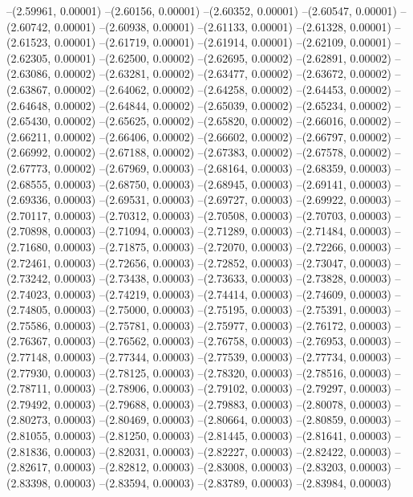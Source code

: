 --(2.59961, 0.00001)
--(2.60156, 0.00001)
--(2.60352, 0.00001)
--(2.60547, 0.00001)
--(2.60742, 0.00001)
--(2.60938, 0.00001)
--(2.61133, 0.00001)
--(2.61328, 0.00001)
--(2.61523, 0.00001)
--(2.61719, 0.00001)
--(2.61914, 0.00001)
--(2.62109, 0.00001)
--(2.62305, 0.00001)
--(2.62500, 0.00002)
--(2.62695, 0.00002)
--(2.62891, 0.00002)
--(2.63086, 0.00002)
--(2.63281, 0.00002)
--(2.63477, 0.00002)
--(2.63672, 0.00002)
--(2.63867, 0.00002)
--(2.64062, 0.00002)
--(2.64258, 0.00002)
--(2.64453, 0.00002)
--(2.64648, 0.00002)
--(2.64844, 0.00002)
--(2.65039, 0.00002)
--(2.65234, 0.00002)
--(2.65430, 0.00002)
--(2.65625, 0.00002)
--(2.65820, 0.00002)
--(2.66016, 0.00002)
--(2.66211, 0.00002)
--(2.66406, 0.00002)
--(2.66602, 0.00002)
--(2.66797, 0.00002)
--(2.66992, 0.00002)
--(2.67188, 0.00002)
--(2.67383, 0.00002)
--(2.67578, 0.00002)
--(2.67773, 0.00002)
--(2.67969, 0.00003)
--(2.68164, 0.00003)
--(2.68359, 0.00003)
--(2.68555, 0.00003)
--(2.68750, 0.00003)
--(2.68945, 0.00003)
--(2.69141, 0.00003)
--(2.69336, 0.00003)
--(2.69531, 0.00003)
--(2.69727, 0.00003)
--(2.69922, 0.00003)
--(2.70117, 0.00003)
--(2.70312, 0.00003)
--(2.70508, 0.00003)
--(2.70703, 0.00003)
--(2.70898, 0.00003)
--(2.71094, 0.00003)
--(2.71289, 0.00003)
--(2.71484, 0.00003)
--(2.71680, 0.00003)
--(2.71875, 0.00003)
--(2.72070, 0.00003)
--(2.72266, 0.00003)
--(2.72461, 0.00003)
--(2.72656, 0.00003)
--(2.72852, 0.00003)
--(2.73047, 0.00003)
--(2.73242, 0.00003)
--(2.73438, 0.00003)
--(2.73633, 0.00003)
--(2.73828, 0.00003)
--(2.74023, 0.00003)
--(2.74219, 0.00003)
--(2.74414, 0.00003)
--(2.74609, 0.00003)
--(2.74805, 0.00003)
--(2.75000, 0.00003)
--(2.75195, 0.00003)
--(2.75391, 0.00003)
--(2.75586, 0.00003)
--(2.75781, 0.00003)
--(2.75977, 0.00003)
--(2.76172, 0.00003)
--(2.76367, 0.00003)
--(2.76562, 0.00003)
--(2.76758, 0.00003)
--(2.76953, 0.00003)
--(2.77148, 0.00003)
--(2.77344, 0.00003)
--(2.77539, 0.00003)
--(2.77734, 0.00003)
--(2.77930, 0.00003)
--(2.78125, 0.00003)
--(2.78320, 0.00003)
--(2.78516, 0.00003)
--(2.78711, 0.00003)
--(2.78906, 0.00003)
--(2.79102, 0.00003)
--(2.79297, 0.00003)
--(2.79492, 0.00003)
--(2.79688, 0.00003)
--(2.79883, 0.00003)
--(2.80078, 0.00003)
--(2.80273, 0.00003)
--(2.80469, 0.00003)
--(2.80664, 0.00003)
--(2.80859, 0.00003)
--(2.81055, 0.00003)
--(2.81250, 0.00003)
--(2.81445, 0.00003)
--(2.81641, 0.00003)
--(2.81836, 0.00003)
--(2.82031, 0.00003)
--(2.82227, 0.00003)
--(2.82422, 0.00003)
--(2.82617, 0.00003)
--(2.82812, 0.00003)
--(2.83008, 0.00003)
--(2.83203, 0.00003)
--(2.83398, 0.00003)
--(2.83594, 0.00003)
--(2.83789, 0.00003)
--(2.83984, 0.00003)
